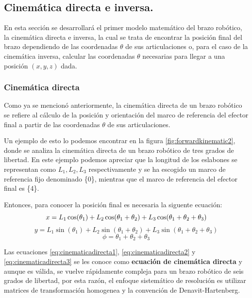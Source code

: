 \subsection{Cinemática directa e inversa.}

En esta sección se desarrollará el primer modelo matemático del brazo robótico, la cinemática directa e inversa, la cual se trata de encontrar la posición final del brazo dependiendo de las coordenadas $\theta$ de sus articulaciones o, para el caso de la cinemática inversa, calcular las coordenadas $\theta$ necesarias para llegar a una posición $(x,y,z)$ dada.

\subsubsection{Cinemática directa} 
Como ya se mencionó anteriormente, la cinemática directa de un brazo robótico se refiere al cálculo de la posición y orientación del marco de referencia del efector final a partir de las coordenadas $\theta$ de sus articulaciones. \cite{University2017}

Un ejemplo de esto lo podemos encontrar en la figura \ref{fig:forwardkinematic2}, donde se analiza la cinemática directa de un brazo robótico de tres grados de libertad. En este ejemplo podemos apreciar que la longitud de los eslabones se representan como $L_1, L_2, L_3$ respectivamente y se ha escogido un marco de referencia fijo denominado \{0\}, mientras que el marco de referencia del efector final es \{4\}. \cite{University2017}

Entonces, para conocer la posición final es necesaria la siguente ecuación:
\begin{equation}\\
\label{eq:cinematicadirecta1}
x = L_1 \cos(\theta_1)+L_2 \cos(\theta_1 + \theta_2)+ L_3 \cos(\theta_1 + \theta_2 + \theta_3)
\end{equation}
\begin{equation}
\label{eq:cinematicadirecta2}
y = L_1 \sin(\theta_1)+L_2 \sin(\theta_1 + \theta_2)+ L_3 \sin(\theta_1 + \theta_2 + \theta_3)
\end{equation}
\begin{equation}
\label{eq:cinematicadirecta3}
\phi = \theta_1 + \theta_2 + \theta_3
\end{equation}

Las ecuaciones \ref{eq:cinematicadirecta1}, \ref{eq:cinematicadirecta2} y \ref{eq:cinematicadirecta3} se les conoce como \textbf{ecuación de cinemática directa} y aunque es válida, se vuelve rápidamente compleja para un brazo robótico de seis grados de libertad, por esta razón, el enfoque sistemático de resolución es utilizar matrices de transformación homogenea y la convención de Denavit-Hartenberg.

